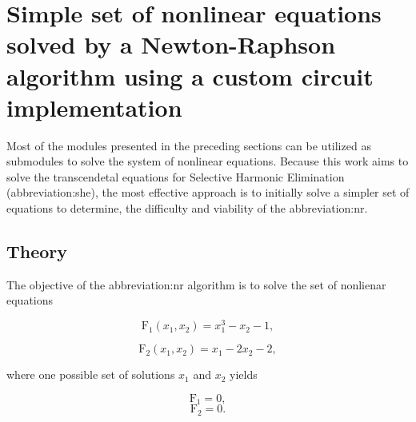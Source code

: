 \documentclass[a4paper, twoside, 11pt]{article}
\begin{document}
\section{Simple set of nonlinear equations solved by a Newton-Raphson algorithm using a custom circuit implementation}\label{sec:simple-set-of-nonlinear-equations-solved-by-a-newton-raphson-algorithm-using-custom-circuit-implementation}
    Most of the modules presented in the preceding sections can be utilized as submodules to solve the system of nonlinear equations. Because this work aims to solve the transcendetal equations for Selective Harmonic Elimination (\gls{abbreviation:she}), the most effective approach is to initially solve a simpler set of equations to determine, the difficulty and viability of the \gls{abbreviation:nr}.
    \subsection{Theory}
        The objective of the \gls{abbreviation:nr} algorithm is to solve the set of nonlienar equations


        \begin{equation}
            \text{F}_1 (x_1, x_2) = x_1^3 - x_2 - 1, 
        \end{equation}

        \begin{equation}
            \text{F}_2 (x_1, x_2) = x_1 - 2 x_2 - 2, 
        \end{equation}

        where one possible set of solutions $x_1$ and $x_2$ yields

        \begin{equation}
            \text{F}_1 = 0, 
        \end{equation}
        \begin{equation}
            \text{F}_2 = 0.
        \end{equation}
\end{document}
